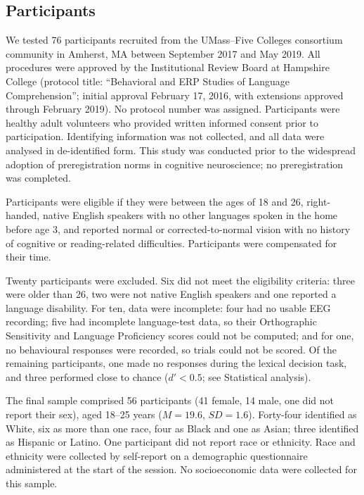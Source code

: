 
\subsection*{Participants}

We tested 76 participants recruited from the UMass--Five Colleges consortium
community in Amherst, MA between September 2017 and May 2019. All procedures were
approved by the Institutional Review Board at Hampshire College (protocol title:
``Behavioral and ERP Studies of Language Comprehension''; initial approval
February 17, 2016, with extensions approved through February 2019). No protocol
number was assigned. Participants were healthy adult volunteers who provided
written informed consent prior to participation. Identifying information was not
collected, and all data were analysed in de-identified form. This study was
conducted prior to the widespread adoption of preregistration norms in cognitive
neuroscience; no preregistration was completed.

Participants were eligible if they were between the ages of 18 and 26,
right-handed, native English speakers with no other languages spoken in the home
before age 3, and reported normal or corrected-to-normal vision with no history
of cognitive or reading-related difficulties. Participants were compensated for
their time.

Twenty participants were excluded. Six did not meet the eligibility criteria:
three were older than 26, two were not native English speakers and one reported
a language disability. For ten,
data were incomplete: four had no usable EEG recording; five had incomplete
language-test data, so their Orthographic Sensitivity and Language Proficiency
scores could not be computed; and for one, no behavioural responses were
recorded, so trials could not be scored. Of the remaining participants, one made
no responses during the lexical decision task, and three performed close to
chance ($d' < 0.5$; see Statistical analysis).

The final sample comprised 56 participants (41 female, 14 male, one did not
report their sex), aged 18--25 years ($M = 19.6$, $SD = 1.6$). Forty-four
identified as White, six as more than one race, four as Black and one as Asian;
three identified as Hispanic or Latino. One participant did not report race or
ethnicity. Race and ethnicity were collected by self-report on a demographic
questionnaire administered at the start of the session.
No socioeconomic data were collected for this sample.
